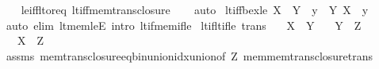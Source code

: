 \begin{isabellebody}
\ \ \isamarkupfalse%
\ le{\isacharunderscore}{\kern0pt}iff{\isacharunderscore}{\kern0pt}lt{\isacharunderscore}{\kern0pt}or{\isacharunderscore}{\kern0pt}eq\ lt{\isacharunderscore}{\kern0pt}iff{\isacharunderscore}{\kern0pt}mem{\isacharunderscore}{\kern0pt}trans{\isacharunderscore}{\kern0pt}closure\isanewline
\ \ \isamarkupfalse%
\ auto%
\endisatagproof
{\isafoldproof}%
%
\isadelimproof
\isanewline
%
\endisadelimproof
\isanewline
{}\isamarkupfalse%
\ lt{\isacharunderscore}{\kern0pt}iff{\isacharunderscore}{\kern0pt}bex{\isacharunderscore}{\kern0pt}le{\isacharcolon}{\kern0pt}\ {\isachardoublequoteopen}X\ {\isacharless}{\kern0pt}\ Y\ {\isasymlongleftrightarrow}\ {\isacharparenleft}{\kern0pt}{\isasymexists}y\ {\isasymin}\ Y{\isachardot}{\kern0pt}\ X\ {\isasymle}\ y{\isacharparenright}{\kern0pt}{\isachardoublequoteclose}\isanewline
%
\isadelimproof
\ \ %
\endisadelimproof
%
\isatagproof
{}\isamarkupfalse%
\ {\isacharparenleft}{\kern0pt}auto\ elim{\isacharcolon}{\kern0pt}\ lt{\isacharunderscore}{\kern0pt}mem{\isacharunderscore}{\kern0pt}leE\ intro{\isacharcolon}{\kern0pt}\ lt{\isacharunderscore}{\kern0pt}if{\isacharunderscore}{\kern0pt}mem{\isacharunderscore}{\kern0pt}if{\isacharunderscore}{\kern0pt}le{\isacharparenright}{\kern0pt}%
\endisatagproof
{\isafoldproof}%
%
\isadelimproof
\isanewline
%
\endisadelimproof
\isanewline
{}\isamarkupfalse%
\ lt{\isacharunderscore}{\kern0pt}if{\isacharunderscore}{\kern0pt}lt{\isacharunderscore}{\kern0pt}if{\isacharunderscore}{\kern0pt}le\ {\isacharbrackleft}{\kern0pt}trans{\isacharbrackright}{\kern0pt}{\isacharcolon}{\kern0pt}\isanewline
\ \ \ {\isachardoublequoteopen}X\ {\isasymle}\ Y{\isachardoublequoteclose}\isanewline
\ \ \ {\isachardoublequoteopen}Y\ {\isacharless}{\kern0pt}\ Z{\isachardoublequoteclose}\isanewline
\ \ \ {\isachardoublequoteopen}X\ {\isacharless}{\kern0pt}\ Z{\isachardoublequoteclose}\isanewline
%
\isadelimproof
\ \ %
\endisadelimproof
%
\isatagproof
{}\isamarkupfalse%
\ assms\ mem{\isacharunderscore}{\kern0pt}trans{\isacharunderscore}{\kern0pt}closure{\isacharunderscore}{\kern0pt}eq{\isacharunderscore}{\kern0pt}bin{\isacharunderscore}{\kern0pt}union{\isacharunderscore}{\kern0pt}idx{\isacharunderscore}{\kern0pt}union{\isacharbrackleft}{\kern0pt}of\ Z{\isacharbrackright}{\kern0pt}\ mem{\isacharunderscore}{\kern0pt}mem{\isacharunderscore}{\kern0pt}trans{\isacharunderscore}{\kern0pt}closure{\isacharunderscore}{\kern0pt}trans\isanewline
\ \ \isamarkupfalse%

\end{isabellebody}
